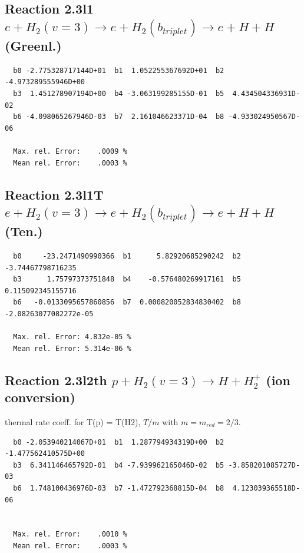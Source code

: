 \documentclass[12pt,dvipdfmx]{article}
\begin{document}
\subsection{
Reaction 2.3l1
$ e + H_2(v=3) \rightarrow e + H_2(b_{triplet}) \rightarrow e + H + H $ (Greenl.)
}


\begin{small}\begin{verbatim}
  b0 -2.775328717144D+01  b1  1.052255367692D+01  b2 -4.973289555946D+00
  b3  1.451278907194D+00  b4 -3.063199285155D-01  b5  4.434504336931D-02
  b6 -4.098065267946D-03  b7  2.161046623371D-04  b8 -4.933024950567D-06

  Max. rel. Error:    .0009 %
  Mean rel. Error:    .0003 %

\end{verbatim}\end{small}


\subsection{
Reaction 2.3l1T
$  e + H_2(v=3) \rightarrow e + H_2(b_{triplet})\rightarrow e + H + H $ (Ten.)
}


\begin{small}\begin{verbatim}
  b0     -23.2471490990366  b1      5.82920685290242  b2     -3.74467798716235
  b3      1.75797373751848  b4    -0.576480269917161  b5     0.115092345155716
  b6   -0.0133095657860856  b7  0.000820052834830402  b8 -2.08263077082272e-05

  Max. rel. Error: 4.832e-05 %
  Mean rel. Error: 5.314e-06 %
\end{verbatim}\end{small}


\subsection{
Reaction 2.3l2th
$ p + H_2(v=3) \rightarrow H + H_2^+$ (ion conversion)
}
thermal rate coeff. for T(p) = T(H2),
$T/m$ with $m=m_{red}=2/3$.

\begin{small}\begin{verbatim}
  b0 -2.053940214067D+01  b1  1.287794934319D+00  b2 -1.477562410575D+00
  b3  6.341146465792D-01  b4 -7.939962165046D-02  b5 -3.858201085727D-03
  b6  1.748100436976D-03  b7 -1.472792368815D-04  b8  4.123039365518D-06


  Max. rel. Error:    .0010 %
  Mean rel. Error:    .0003 %

\end{verbatim}\end{small}
\end{document}
